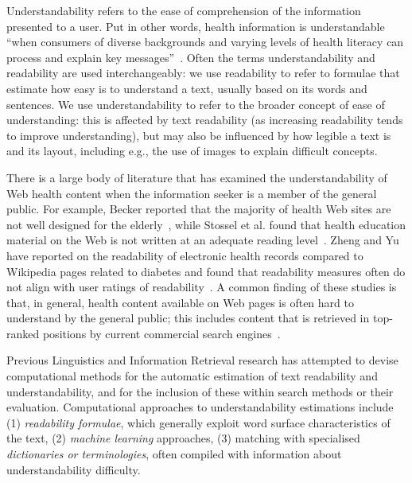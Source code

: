 \documentclass[10pt,a4paper]{article}
\begin{document}
\label{sec:related}
Understandability refers to the ease of comprehension of the information presented to a user. Put in other words, health information is understandable ``when consumers of diverse backgrounds and varying levels of health literacy can process and explain key messages''~\cite{shoemaker2014development}. Often the terms understandability and readability are used interchangeably: we use readability to refer to formulae that estimate how easy is to understand a text, usually based on its words and sentences. We use understandability to refer to the broader concept of ease of understanding: this is affected by text readability (as increasing readability tends to improve understanding), but may also be influenced by how legible a text is and its layout, including e.g., the use of images to explain difficult concepts.

There is a large body of literature that has examined the understandability of Web health content when the information seeker is a member of the general public. For example, Becker reported that the majority of health Web sites are not well designed for the elderly~\cite{becker04}, while Stossel et al. found that  health education material on the Web is not written at an adequate reading level~\cite{stossel12}. Zheng and Yu have reported on the readability of electronic health records compared to Wikipedia pages related to diabetes and found that readability measures often do not align with user ratings of readability~\cite{zheng2017readability}. 
A common finding of these studies is that, in general, health content available on Web pages is often hard to understand by the general public; this includes content that is retrieved in top-ranked positions by current commercial search engines~\cite{graber99,fitzsimmons10,wiener13,patel13,meillier17,ellimoottil12}.

Previous Linguistics and Information Retrieval research has attempted to devise computational methods for the automatic estimation of text readability and understandability, and for the inclusion of these within search methods or their evaluation. Computational approaches to understandability estimations include (1) \textit{readability formulae}, which generally exploit word surface characteristics of the text, (2) \textit{machine learning} approaches, (3) matching with specialised \textit{dictionaries or terminologies}, often compiled with information about understandability difficulty.
\end{document}
